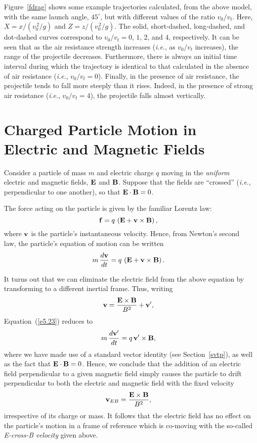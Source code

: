 Figure~\ref{fdrag} shows some example trajectories calculated, from the above model, with the same launch
angle, $45^\circ$, but with different values of the ratio $v_0/v_t$. Here,
$X=x/(v_0^{\,2}/g)$ and $Z=z/(v_0^{\,2}/g)$. The solid, short-dashed,
long-dashed, and dot-dashed curves correspond to $v_0/v_t = 0$, $1$, $2$,
and $4$, respectively. It can be seen that as the air resistance strength
increases  ({\em i.e.}, as $v_0/v_t$ increases), the range of the
projectile decreases.  Furthermore, there is always an initial time interval
during which the trajectory is identical to that calculated in the absence
of air resistance ({\em i.e.}, $v_0/v_t=0$). Finally, in the presence of
air resistance, the projectile tends to fall more steeply than it rises.
Indeed, in the presence of strong air resistance ({\em i.e.}, $v_0/v_t=4$), the projectile falls almost
vertically.

\section{Charged Particle Motion in  Electric and Magnetic Fields}
Consider a particle of mass $m$ and electric charge $q$ moving
in the {\em uniform}\/ electric and magnetic fields, ${\bf E}$ and ${\bf B}$. 
Suppose that the fields are ``crossed'' ({\em i.e.}, perpendicular to
one another), so that ${\bf E}\cdot{\bf B} = 0$. 

The force acting on the particle is given by the familiar Lorentz law:
\begin{equation}
{\bf f} = q\,\left({\bf E} + {\bf v}\times{\bf B}\right),
\end{equation}
where ${\bf v}$ is the particle's instantaneous velocity. Hence, from
Newton's second law, the particle's equation of motion can be written
\begin{equation}\label{e5.23}
m\,\frac{d{\bf v}}{dt} = q\,\left({\bf E} + {\bf v}\times{\bf B}\right).
\end{equation}

It turns out that we can eliminate the electric field from the above equation by
transforming to a different inertial frame. Thus, writing
\begin{equation}
{\bf v} = \frac{{\bf E}\times{\bf B}}{B^2} + {\bf v}',
\end{equation}
Equation~(\ref{e5.23}) reduces to
\begin{equation}\label{e5.24}
m\,\frac{d{\bf v}'}{dt} = q\,{\bf v}'\times{\bf B},
\end{equation}
where we have made use of a standard vector identity (see Section~\ref{svtp}), as well
as the fact that ${\bf E}\cdot{\bf B} = 0$.
Hence, we conclude that the addition of an electric field perpendicular to a
given magnetic field simply causes the particle to drift perpendicular to both the electric and magnetic
field with the fixed velocity
\begin{equation}\label{e5.26}
{\bf v}_{EB} = \frac{{\bf E}\times{\bf B}}{B^2},
\end{equation}
irrespective of its
charge or mass.
It follows that the electric field has no effect on the particle's
motion in  a frame of reference which is co-moving with the so-called {\em E-cross-B velocity}\/ given above.


